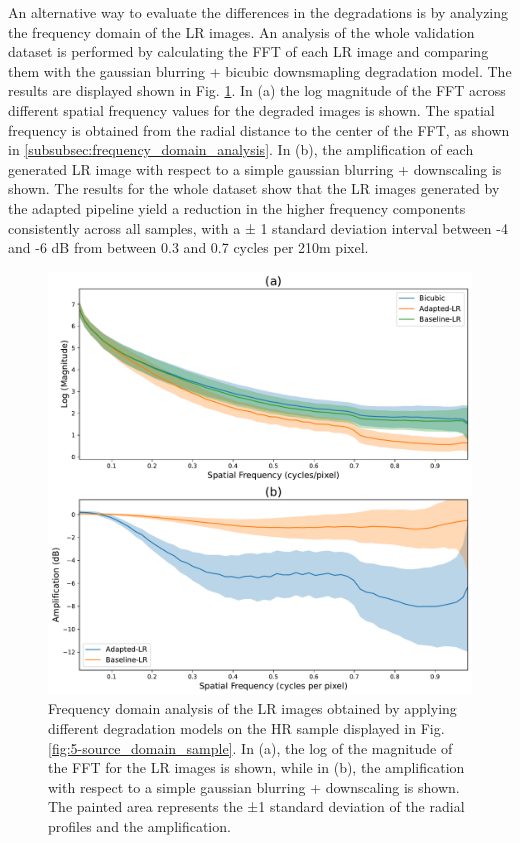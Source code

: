         An alternative way to evaluate the differences in the degradations is by analyzing the frequency domain of the LR images.
        An analysis of the whole validation dataset is performed by calculating the FFT of each LR image and comparing them with the gaussian blurring + bicubic downsmapling degradation model.
        The results are displayed shown in Fig. \ref{fig:5-lr-images-fft-comparison}. 
        In (a) the log magnitude of the FFT across different spatial frequency values for the degraded images is shown. 
        The spatial frequency is obtained from the radial distance to the center of the FFT, as shown in \ref{subsubsec:frequency_domain_analysis}.
        In (b), the amplification of each generated LR image with respect to a simple gaussian blurring + downscaling is shown. 
        The results for the whole dataset show that the LR images generated by the adapted pipeline yield a reduction in the higher frequency components consistently across all samples, with a ± 1 standard deviation interval between -4 and -6 dB from between 0.3 and 0.7 cycles per 210m pixel.

        \begin{figure}[H]
            \centering
            \includegraphics[scale=0.5]{Includes/5-source-lr-amplification-statistics.pdf}
            \caption{Frequency domain analysis of the LR images obtained by applying different degradation models on the HR sample displayed in Fig. \ref{fig:5-source_domain_sample}.
                     In (a), the log of the magnitude of the FFT for the LR images is shown,
                     while in (b), the amplification with respect to a  simple gaussian blurring + downscaling is shown.
                     The painted area represents the ±1 standard deviation of the radial profiles and the amplification. }
            \label{fig:5-lr-images-fft-comparison}
        \end{figure}




